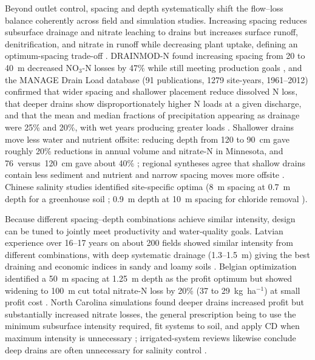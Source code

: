 \documentclass[11pt]{article}
\begin{document}
Beyond outlet control, spacing and depth systematically shift the flow--loss
balance coherently across field and simulation studies. Increasing spacing
reduces subsurface drainage and nitrate leaching to drains but increases surface
runoff, denitrification, and nitrate in runoff while decreasing plant uptake,
defining an optimum-spacing trade-off \parencite{ElSadek2002,ElSadek2002b}.
DRAINMOD-N found increasing spacing from 20 to 40~m decreased NO$_3$-N losses by
47\% while still meeting production goals \parencite{Skaggs1995}, and the MANAGE
Drain Load database (91 publications, 1279 site-years, 1961--2012) confirmed that
wider spacing and shallower placement reduce dissolved N loss, that deeper drains
show disproportionately higher N loads at a given discharge, and that the mean
and median fractions of precipitation appearing as drainage were 25\% and 20\%,
with wet years producing greater loads \parencite{Christianson2015}. Shallower
drains move less water and nutrient offsite: reducing depth from 120 to 90~cm
gave roughly 20\% reductions in annual volume and nitrate-N in Minnesota, and
76~versus~120~cm gave about 40\% \parencite{Strock2011}; regional syntheses agree
that shallow drains contain less sediment and nutrient and narrow spacing moves
more offsite \parencite{FAUSEY1995}. Chinese salinity studies identified
site-specific optima (8~m spacing at 0.7~m depth for a greenhouse soil
\parencite{Shao2012}; 0.9~m depth at 10~m spacing for chloride removal
\parencite{Yan2013b}).

Because different spacing--depth combinations achieve similar intensity, design
can be tuned to jointly meet productivity and water-quality goals. Latvian
experience over 16--17 years on about 200 fields showed similar intensity from
different combinations, with deep systematic drainage (1.3--1.5~m) giving the
best draining and economic indices in sandy and loamy soils
\parencite{SHKINKIS1979}. Belgian optimization identified a 50~m spacing at
1.25~m depth as the profit optimum but showed widening to 100~m cut total
nitrate-N loss by 20\% (37 to 29~kg~ha$^{-1}$) at small profit cost
\parencite{ElSadek2002b}. North Carolina simulations found deeper drains
increased profit but substantially increased nitrate losses, the general
prescription being to use the minimum subsurface intensity required, fit systems
to soil, and apply CD when maximum intensity is unnecessary
\parencite{Breve1998}; irrigated-system reviews likewise conclude deep drains are
often unnecessary for salinity control \parencite{Ritzema2011}.
\end{document}
